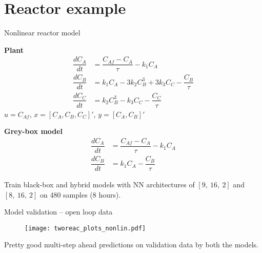 \documentclass[xcolor=dvipsnames, 8pt]{beamer} %
\begin{document}
\section{Reactor example}

\begin{frame}{Nonlinear reactor model}

\textbf{Plant}
\begin{align*}
	\dfrac{dC_A}{dt} &= \dfrac{C_{Af} - C_A}{\tau} - k_1C_A\\
	\dfrac{dC_B}{dt} &= k_1C_A - 3k_2C^3_B + 3k_3C_C- \dfrac{C_B}{\tau}\\
	\dfrac{dC_C}{dt} &= k_2C^3_B - k_3C_C - \dfrac{C_C}{\tau}
\end{align*}
$u = C_{Af}$, $x = [C_A, C_B, C_C]'$, $y = [C_A, C_B]'$

\vspace{0.2in}
\textbf{Grey-box model}
\begin{align*}
  \dfrac{dC_A}{dt} &= \dfrac{C_{Af} - C_A}{\tau} - k_1C_A\\
  \dfrac{dC_B}{dt} &= k_1C_A - \dfrac{C_B}{\tau}
\end{align*}

\vspace{0.2in}
Train black-box and hybrid models with NN 
architectures of $[9, \ 16, \ 2]$ and $[8, \ 16, \ 2]$
on 480 samples (8 hours).
\end{frame}

\begin{frame}{Model validation -- open loop data}
\vspace{-0.1in}
\begin{figure}
\centering
\texttt{[image: tworeac\_plots\_nonlin.pdf]}
\end{figure}
\vspace{-0.2in}
Pretty good multi-step ahead predictions on validation data 
by both the models. 
\end{frame}
\end{document}
